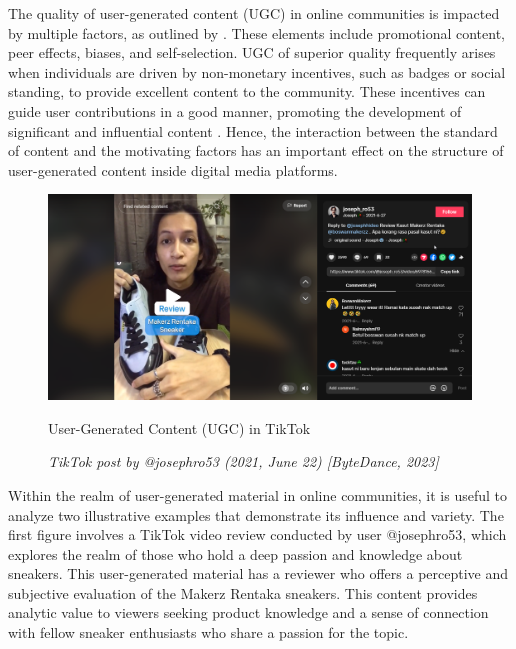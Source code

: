 The quality of user-generated content (UGC) in online communities is impacted by multiple factors, as outlined by \textcite{luca21}. These elements include promotional content, peer effects, biases, and self-selection. UGC of superior quality frequently arises when individuals are driven by non-monetary incentives, such as badges or social standing, to provide excellent content to the community. These incentives can guide user contributions in a good manner, promoting the development of significant and influential content \parencite{luca21}. Hence, the interaction between the standard of content and the motivating factors has an important effect on the structure of user-generated content inside digital media platforms.\\

\begin{figure}[h]
    \centering
    \includegraphics[width=0.9\linewidth]{mainmatter/images/ugc1.png}
    \caption{User-Generated Content (UGC) in TikTok}
    \caption*{\textit{TikTok post by @josephro53 (2021, June 22) [ByteDance, 2023]}}
    \label{fig:myfig3}
\end{figure}
Within the realm of user-generated material in online communities, it is useful to analyze two illustrative examples that demonstrate its influence and variety. The first figure involves a TikTok video review conducted by user @josephro53, which explores the realm of those who hold a deep passion and knowledge about sneakers. This user-generated material has a reviewer who offers a perceptive and subjective evaluation of the Makerz Rentaka sneakers. This content provides analytic value to viewers seeking product knowledge and a sense of connection with fellow sneaker enthusiasts who share a passion for the topic. \\

